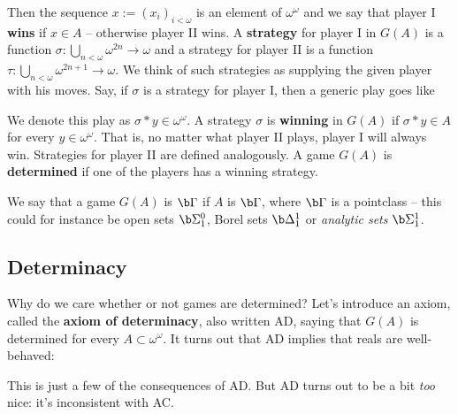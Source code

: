 Then the sequence $x:=(x_i)_{i<\omega}$ is an element of $\omega^\omega$ and we say that player I \textbf{wins} if $x\in A$ -- otherwise player II wins. A \textbf{strategy} for player I in $G(A)$ is a function $\sigma:\bigcup_{n<\omega}\omega^{2n}\to\omega$ and a strategy for player II is a function $\tau:\bigcup_{n<\omega}\omega^{2n+1}\to\omega$. We think of such strategies as supplying the given player with his moves. Say, if $\sigma$ is a strategy for player I, then a generic play goes like

We denote this play as $\sigma*y\in\omega^\omega$. A strategy $\sigma$ is \textbf{winning} in $G(A)$ if $\sigma*y\in A$ for every $y\in\omega^\omega$. That is, no matter what player II plays, player I will always win. Strategies for player II are defined analogously. A game $G(A)$ is \textbf{determined} if one of the players has a winning strategy.

\qquad We say that a game $G(A)$ is $\b\Gamma$ if $A$ is $\b\Gamma$, where $\b\Gamma$ is a pointclass -- this could for instance be open sets $\b\Sigma^0_1$, Borel sets $\b\Delta^1_1$ or \textit{analytic sets} $\b\Sigma^1_1$.\\


\subsection{Determinacy}

Why do we care whether or not games are determined? Let's introduce an axiom, called the \textbf{axiom of determinacy}, also written AD, saying that $G(A)$ is determined for every $A\subset\omega^\omega$. It turns out that AD implies that reals are well-behaved:


This is just a few of the consequences of AD. But AD turns out to be a bit \textit{too} nice: it's inconsistent with AC.


